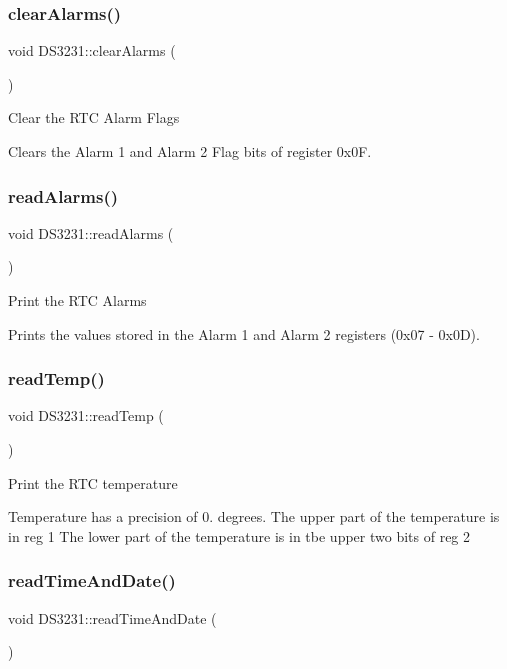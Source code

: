 \subsubsection{\texorpdfstring{clear\+Alarms()}{clearAlarms()}}
{\footnotesize\ttfamily void D\+S3231\+::clear\+Alarms (\begin{DoxyParamCaption}{ }\end{DoxyParamCaption})}

Clear the R\+TC Alarm Flags

Clears the Alarm 1 and Alarm 2 Flag bits of register 0x0F.\mbox{\label{classDS3231_aee6cdb9ddbce1c2efe76d50cd042fb08}} 
\subsubsection{\texorpdfstring{read\+Alarms()}{readAlarms()}}
{\footnotesize\ttfamily void D\+S3231\+::read\+Alarms (\begin{DoxyParamCaption}{ }\end{DoxyParamCaption})}

Print the R\+TC Alarms

Prints the values stored in the Alarm 1 and Alarm 2 registers (0x07 -\/ 0x0D).\mbox{\label{classDS3231_a9529ddedfae9e6e427197c26ac7c8f0b}} 
\subsubsection{\texorpdfstring{read\+Temp()}{readTemp()}}
{\footnotesize\ttfamily void D\+S3231\+::read\+Temp (\begin{DoxyParamCaption}{ }\end{DoxyParamCaption})}

Print the R\+TC temperature

Temperature has a precision of 0. degrees. The upper part of the temperature is in reg 1 The lower part of the temperature is in tbe upper two bits of reg 2\mbox{\label{classDS3231_a847c85a36bf3ab13c942b91733bbbe24}} 
\subsubsection{\texorpdfstring{read\+Time\+And\+Date()}{readTimeAndDate()}}
{\footnotesize\ttfamily void D\+S3231\+::read\+Time\+And\+Date (\begin{DoxyParamCaption}{ }\end{DoxyParamCaption})}

